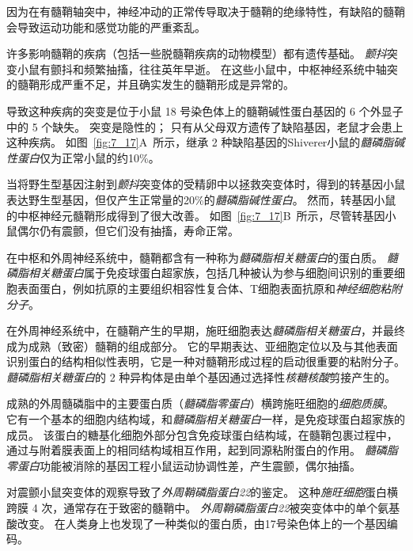 \begin{proposition}[髓鞘蛋白缺陷破坏神经信号传导] \label{box:7_3}
	
	\quad \quad 因为在有髓鞘轴突中，神经冲动的正常传导取决于髓鞘的绝缘特性，有缺陷的髓鞘会导致运动功能和感觉功能的严重紊乱。
	
	\quad \quad 许多影响髓鞘的疾病（包括一些脱髓鞘疾病的动物模型）都有遗传基础。
	\textit{颤抖}突变小鼠有颤抖和频繁抽搐，往往英年早逝。
	在这些小鼠中，中枢神经系统中轴突的髓鞘形成严重不足，并且确实发生的髓鞘形成是异常的。
	
	\quad \quad 导致这种疾病的突变是位于小鼠 18 号染色体上的髓鞘碱性蛋白基因的 6 个外显子中的 5 个缺失。
	突变是隐性的；
	只有从父母双方遗传了缺陷基因，老鼠才会患上这种疾病。
	如图~\ref{fig:7_17}A~所示，继承 2 种缺陷基因的Shiverer小鼠的\textit{髓磷脂碱性蛋白}仅为正常小鼠的约10\%。
	
	\quad \quad 当将野生型基因注射到\textit{颤抖}突变体的受精卵中以拯救突变体时，得到的转基因小鼠表达野生型基因，但仅产生正常量的20\%的\textit{髓磷脂碱性蛋白}。
	然而，转基因小鼠的中枢神经元髓鞘形成得到了很大改善。
	如图~\ref{fig:7_17}B~所示，尽管转基因小鼠偶尔仍有震颤，但它们没有抽搐，寿命正常。
	
	\quad \quad 在中枢和外周神经系统中，髓鞘都含有一种称为\textit{髓磷脂相关糖蛋白}的蛋白质。
	\textit{髓磷脂相关糖蛋白}属于免疫球蛋白超家族，包括几种被认为参与细胞间识别的重要细胞表面蛋白，例如抗原的主要组织相容性复合体、T细胞表面抗原和\textit{神经细胞粘附分子}。
	
	\quad \quad 在外周神经系统中，在髓鞘产生的早期，施旺细胞表达\textit{髓磷脂相关糖蛋白}，并最终成为成熟（致密）髓鞘的组成部分。
	它的早期表达、亚细胞定位以及与其他表面识别蛋白的结构相似性表明，它是一种对髓鞘形成过程的启动很重要的粘附分子。
	\textit{髓磷脂相关糖蛋白}的 2 种异构体是由单个基因通过选择性\textit{核糖核酸}剪接产生的。
	
	\quad 成熟的外周髓磷脂中的主要蛋白质（\textit{髓磷脂零蛋白}）横跨施旺细胞的\textit{细胞质膜}。
	它有一个基本的细胞内结构域，和\textit{髓磷脂相关糖蛋白}一样，是免疫球蛋白超家族的成员。
	该蛋白的糖基化细胞外部分包含免疫球蛋白结构域，在髓鞘包裹过程中，通过与附着膜表面上的相同结构域相互作用，起到同源粘附蛋白的作用。
	\textit{髓磷脂零蛋白}功能被消除的基因工程小鼠运动协调性差，产生震颤，偶尔抽搐。
	
	\quad 对震颤小鼠突变体的观察导致了\textit{外周鞘磷脂蛋白22}的鉴定。
	这种\textit{施旺细胞}蛋白横跨膜 4 次，通常存在于致密的髓鞘中。
	\textit{外周鞘磷脂蛋白22}被突变体中的单个氨基酸改变。
	在人类身上也发现了一种类似的蛋白质，由17号染色体上的一个基因编码。
	

\end{proposition}
